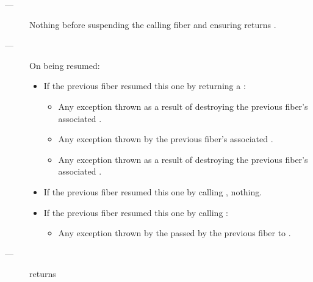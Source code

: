 \except
\begin{description}
    \item[---] Nothing before suspending the calling fiber and
               ensuring \emptyfn returns \true.
    \item[---] On being resumed:
    \begin{itemize}
        \item If the previous fiber resumed this one by returning a \fiber:
            \begin{itemize}
                \item Any exception thrown as a result of destroying the
                      previous fiber's associated .
                \item Any exception thrown by the previous fiber's
                      associated .
                \item Any exception thrown as a result of destroying the
                      previous fiber's associated .
            \end{itemize}
        \item If the previous fiber resumed this one by calling \someresume,
              nothing.
        \item If the previous fiber resumed this one by calling \anyresumewith:
        \begin{itemize}
            \item Any exception thrown by the  passed by the previous
                  fiber to \anyresumewith.
        \end{itemize}
    \end{itemize}
\end{description}

\postcond
\begin{description}
    \item[---] \emptyfn returns \true
\end{description}



